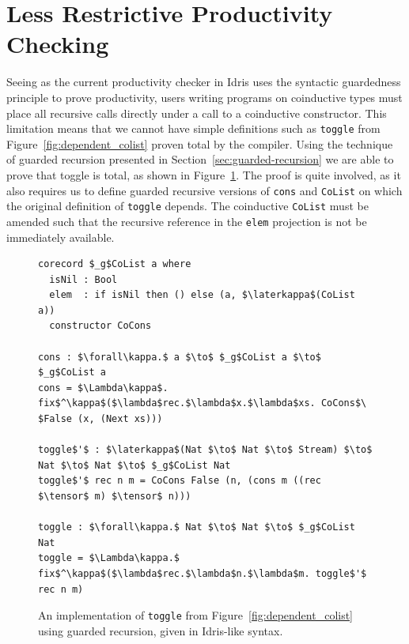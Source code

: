 \section{Less Restrictive Productivity Checking} 
\label{sec:less-restr-prod}


Seeing as the current productivity checker in Idris uses the syntactic
guardedness principle to prove productivity, users writing programs on
coinductive types must place all recursive calls directly under a call to a
coinductive constructor. This limitation means that we cannot have simple
definitions such as \texttt{toggle} from Figure~\ref{fig:dependent_colist}
proven total by the compiler. Using the technique of guarded recursion presented
in Section~\ref{sec:guarded-recursion} we are able to prove that toggle is
total, as shown in Figure~\ref{fig:toggle_guarded_recursion}. The proof is quite
involved, as it also requires us to define guarded recursive versions of
\texttt{cons} and \texttt{CoList} on which the original definition of
\texttt{toggle} depends. The coinductive \texttt{CoList} must be amended such
that the recursive reference in the \texttt{elem} projection is not be
immediately available.

\begin{figure}[h]
\begin{lstlisting}[mathescape]
corecord $_g$CoList a where
  isNil : Bool
  elem  : if isNil then () else (a, $\laterkappa$(CoList a))
  constructor CoCons

cons : $\forall\kappa.$ a $\to$ $_g$CoList a $\to$ $_g$CoList a
cons = $\Lambda\kappa$. fix$^\kappa$($\lambda$rec.$\lambda$x.$\lambda$xs. CoCons$\ $False (x, (Next xs)))

toggle$'$ : $\laterkappa$(Nat $\to$ Nat $\to$ Stream) $\to$ Nat $\to$ Nat $\to$ $_g$CoList Nat
toggle$'$ rec n m = CoCons False (n, (cons m ((rec $\tensor$ m) $\tensor$ n))) 

toggle : $\forall\kappa.$ Nat $\to$ Nat $\to$ $_g$CoList Nat
toggle = $\Lambda\kappa.$ fix$^\kappa$($\lambda$rec.$\lambda$n.$\lambda$m. toggle$'$ rec n m)
\end{lstlisting}
  \caption{An implementation of \texttt{toggle} from
    Figure~\ref{fig:dependent_colist} using guarded recursion, given in
    Idris-like syntax.}
\label{fig:toggle_guarded_recursion}
\end{figure}

